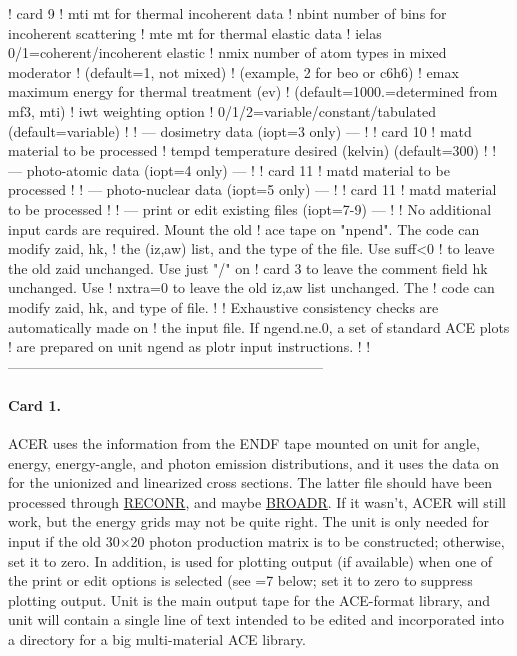 \begin{ccode}
   ! card 9
   !    mti      mt for thermal incoherent data
   !    nbint    number of bins for incoherent scattering
   !    mte      mt for thermal elastic data
   !    ielas    0/1=coherent/incoherent elastic
   !    nmix     number of atom types in mixed moderator
   !             (default=1, not mixed)
   !             (example, 2 for beo or c6h6)
   !    emax     maximum energy for thermal treatment (ev)
   !             (default=1000.=determined from mf3, mti)
   !    iwt      weighting option
   !             0/1/2=variable/constant/tabulated (default=variable)
   !
   !   --- dosimetry data (iopt=3 only) ---
   !
   ! card 10
   !    matd     material to be processed
   !    tempd    temperature desired (kelvin) (default=300)
   !
   !   --- photo-atomic data (iopt=4 only) ---
   !
   ! card 11
   !    matd     material to be processed
   !
   !   --- photo-nuclear data (iopt=5 only) ---
   !
   ! card 11
   !    matd     material to be processed
   !
   !   --- print or edit existing files (iopt=7-9) ---
   !
   !    No additional input cards are required.  Mount the old
   !    ace tape on "npend".  The code can modify zaid, hk,
   !    the (iz,aw) list, and the type of the file.  Use suff<0
   !    to leave the old zaid unchanged.  Use just "/" on
   !    card 3 to leave the comment field hk unchanged.  Use
   !    nxtra=0 to leave the old iz,aw list unchanged.  The
   !    code can modify zaid, hk, and type of file.
   !
   !    Exhaustive consistency checks are automatically made on
   !    the input file.  If ngend.ne.0, a set of standard ACE plots
   !    are prepared on unit ngend as plotr input instructions.
   !
   !--------------------------------------------------------------------

\end{ccode}
\normalsize

\paragraph{Card 1.}
ACER uses the information from the ENDF tape mounted on unit
 for angle, energy, energy-angle, and photon emission
distributions, and it uses the data on  for the unionized
and linearized cross sections.  The latter file should have been
processed through \hyperlink{sRECONRhy}{RECONR}, and maybe
\hyperlink{sBROADRhy}{BROADR}.  If it wasn't, ACER will
still work, but the energy grids may not be quite right.  The
 unit is only needed for input if the old 30$\times$20
photon production matrix is to be constructed; otherwise, set it to zero.
In addition,  is used for plotting output (if available)
when one of the print or edit options is selected
(see =7 below; set it to zero to suppress plotting output.
Unit  is the main output tape for the ACE-format library, and
unit  will contain a single line of text intended to be
edited and incorporated into a directory for a big multi-material ACE
library.


